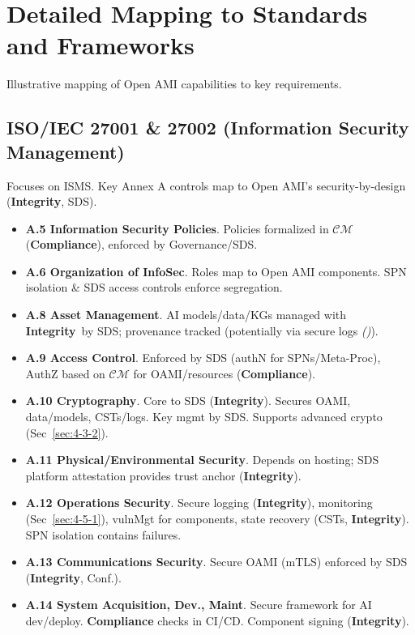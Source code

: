 \documentclass[12pt,a4paper]{report}
\renewcommand{\citep}[1]{\textit{\scriptsize{(\cite{#1})}}}
\newcommand{\Integrity}{\textbf{Integrity}}
\begin{document}
	\section{Detailed Mapping to Standards and Frameworks}
	\label{app:compmap_detailed_mapping}
	
	Illustrative mapping of Open AMI capabilities to key requirements.
	
	\subsection{ISO/IEC 27001 \& 27002 (Information Security Management)}
	\label{app:compmap_iso27k}
	
	Focuses on ISMS. Key Annex A controls map to Open AMI's security-by-design (\Integrity, SDS).
	
	\begin{itemize}
		\item \textbf{A.5 Information Security Policies}. Policies formalized in $\mathcal{CM}$ (\textbf{Compliance}), enforced by Governance/SDS.
		\item \textbf{A.6 Organization of InfoSec}. Roles map to Open AMI components. SPN isolation \& SDS access controls enforce segregation.
		\item \textbf{A.8 Asset Management}. AI models/data/KGs managed with \Integrity\ by SDS; provenance tracked (potentially via secure logs \citep{ProML_Provenance_2022}).
		\item \textbf{A.9 Access Control}. Enforced by SDS (authN for SPNs/Meta-Proc), AuthZ based on $\mathcal{CM}$ for OAMI/resources (\textbf{Compliance}).
		\item \textbf{A.10 Cryptography}. Core to SDS (\Integrity). Secures OAMI, data/models, CSTs/logs. Key mgmt by SDS. Supports advanced crypto (Sec~\ref{sec:4-3-2}).
		\item \textbf{A.11 Physical/Environmental Security}. Depends on hosting; SDS platform attestation provides trust anchor (\Integrity).
		\item \textbf{A.12 Operations Security}. Secure logging (\Integrity), monitoring (Sec~\ref{sec:4-5-1}), vulnMgt for components, state recovery (CSTs, \Integrity). SPN isolation contains failures.
		\item \textbf{A.13 Communications Security}. Secure OAMI (mTLS) enforced by SDS (\Integrity, Conf.).
		\item \textbf{A.14 System Acquisition, Dev., Maint}. Secure framework for AI dev/deploy. \textbf{Compliance} checks in CI/CD. Component signing (\Integrity).

\end{itemize}
\end{document}
